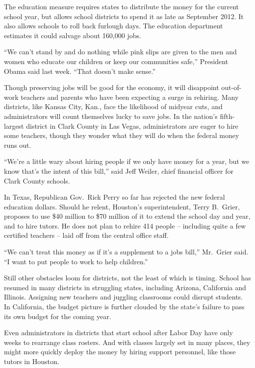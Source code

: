 ﻿\documentclass[12pt]{article}
\begin{document}
The education measure requires states to distribute the money for the current school year, but
allows school districts to spend it as late as September 2012. It also allows schools to roll back
furlough days. The education department estimates it could salvage about 160,000 jobs.

``We can't stand by and do nothing while pink slips are given to the men and women who educate our
children or keep our communities safe,'' President Obama said last week. ``That doesn't make
sense.''

Though preserving jobs will be good for the economy, it will disappoint out-of-work teachers and
parents who have been expecting a surge in rehiring. Many districts, like Kansas City, Kan., face
the likelihood of midyear cuts, and administrators will count themselves lucky to save jobs. In the
nation's fifth-largest district in Clark County in Las Vegas, administrators are eager to hire some
teachers, though they wonder what they will do when the federal money runs out.

``We're a little wary about hiring people if we only have money for a year, but we know that's the
intent of this bill,'' said Jeff Weiler, chief financial officer for Clark County schools.

In Texas, Republican Gov.~Rick Perry so far has rejected the new federal education dollars. Should
he relent, Houston's superintendent, Terry B.~Grier, proposes to use \$40 million to \$70 million of
it to extend the school day and year, and to hire tutors. He does not plan to rehire 414 people --
including quite a few certified teachers -- laid off from the central office staff.

``We can't treat this money as if it's a supplement to a jobs bill,'' Mr.~Grier said. ``I want to
put people to work to help children.''

Still other obstacles loom for districts, not the least of which is timing. School has resumed in
many districts in struggling states, including Arizona, California and Illinois. Assigning new
teachers and juggling classrooms could disrupt students. In California, the budget picture is
further clouded by the state's failure to pass its own budget for the coming year.

Even administrators in districts that start school after Labor Day have only weeks to rearrange
class rosters. And with classes largely set in many places, they might more quickly deploy the money
by hiring support personnel, like those tutors in Houston.
\end{document}
